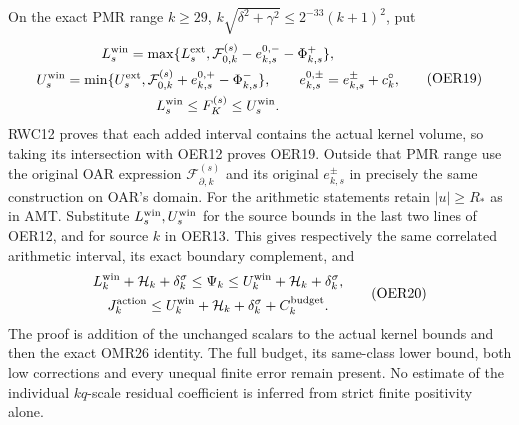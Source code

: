 \documentclass[11pt,a4paper]{article}
\begin{document}
On the exact PMR range $k\ge29$,
$k\sqrt{\delta^2+\gamma^2}\le2^{-33}(k+1)^2$, put
\[
\begin{gathered}
 L_s^{\rm win}=\max\{L_s^{\rm ext},
   \mathcal F_{0,k}^{(s)}-e_{k,s}^{0,-}-\Phi^+_{k,s}\},\\
 U_s^{\rm win}=\min\{U_s^{\rm ext},
   \mathcal F_{0,k}^{(s)}+e_{k,s}^{0,+}-\Phi^-_{k,s}\},
 \qquad e_{k,s}^{0,\pm}=e_{k,s}^{\pm}+c_k^\circ,\\
 L_s^{\rm win}\le F_K^{(s)}\le U_s^{\rm win}.
\end{gathered}\tag{OER19}
\]
RWC12 proves that each added interval contains the actual kernel
volume, so taking its intersection with OER12 proves OER19.
Outside that PMR range use the original OAR expression
$\mathcal F_{\partial,k}^{(s)}$ and its original $e_{k,s}^{\pm}$
in precisely the same construction on OAR's domain.
For the arithmetic statements retain $|u|\ge R_*$ as in AMT.
Substitute $L_s^{\rm win},U_s^{\rm win}$ for the source bounds
in the last two lines of OER12, and for source $k$ in OER13.
This gives respectively the same correlated arithmetic interval,
its exact boundary complement, and
\[
\begin{gathered}
 L_k^{\rm win}+\mathcal H_k+\delta_k^\sigma
 \le\Psi_k\le U_k^{\rm win}+\mathcal H_k+\delta_k^\sigma,\\
 J_k^{\rm action}\le U_k^{\rm win}+\mathcal H_k
                  +\delta_k^\sigma+C_k^{\rm budget}.
\end{gathered}\tag{OER20}
\]
The proof is addition of the unchanged scalars to the actual
kernel bounds and then the exact OMR26 identity. The full
budget, its same-class lower bound, both low corrections and
every unequal finite error remain present. No estimate of
the individual $kq$-scale residual coefficient is inferred
from strict finite positivity alone.

\end{document}
